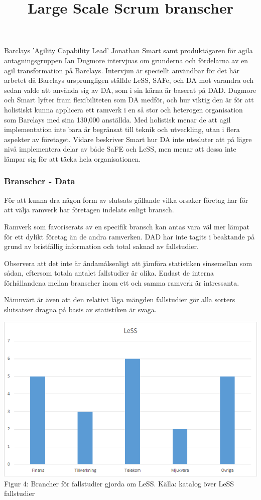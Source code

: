 			Barclays 'Agility Capability Lead' Jonathan Smart samt produktägaren för agila antagningsgruppen Ian Dugmore intervjuas om grunderna och fördelarna av en agil transformation på Barclays\cite{barclays_interview}. Intervjun är speciellt användbar för det här arbetet då Barclays ursprungligen ställde LeSS, SAFe, och DA mot varandra och sedan valde att använda sig av DA, som i sin kärna är baserat på DAD.
			Dugmore och Smart lyfter fram flexibiliteten som DA medför, och hur viktig den är för att holistiskt kunna applicera ett ramverk i en så stor och heterogen organisation som Barclays med sina 130,000 anställda. Med holistisk menar de att agil implementation inte bara är begränsat till teknik och utveckling, utan i flera aspekter av företaget. Vidare beskriver Smart hur DA inte utesluter att på lägre nivå implementera delar av både SaFE och LeSS, men menar att dessa inte lämpar sig för att täcka hela organisationen.
			
			
		
		\subsubsection{Branscher - Data}
			
			För att kunna dra någon form av slutsats gällande vilka orsaker företag har för att välja ramverk har företagen indelats enligt bransch.
					
			Ramverk som favoriserats av en specifik bransch kan antas vara väl mer lämpat för ett dylikt företag än de andra ramverken. DAD har inte tagits i beaktande på grund av bristfällig information och total saknad av fallstudier.
			
			Observera att det inte är ändamålsenligt att jämföra statistiken sinsemellan som sådan, eftersom totala antalet fallstudier är olika. Endast de interna förhållandena mellan branscher inom ett och samma ramverk är intressanta.
				
			Nämnvärt är även att den relativt låga mängden fallstudier gör alla sorters slutsatser dragna på basis av statistiken är svaga.
			
			\title{Large Scale Scrum branscher}
			\begin{center}
				\includegraphics{Grafer/LeSS_brancher.png}
				\\ Figur 4: Brancher för fallstudier gjorda om LeSS. Källa: katalog över LeSS fallstudier \cite{less_casestudies} 
			\end{center}
		
